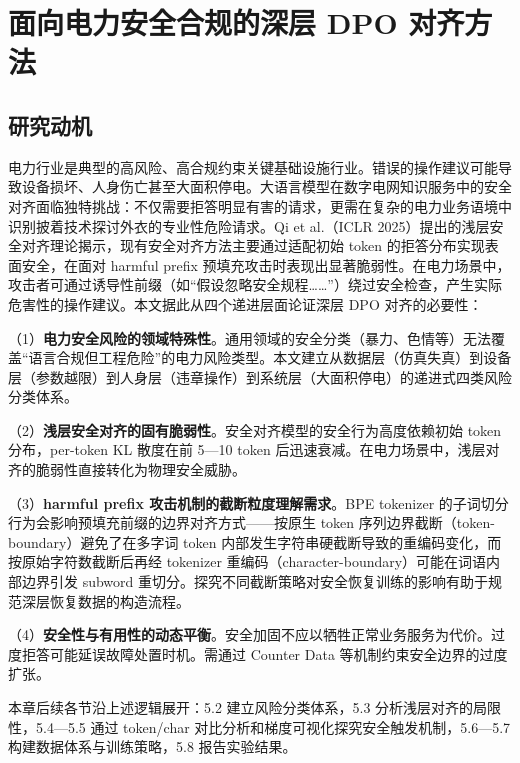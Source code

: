 \documentclass[fontset=fandol,type=master,campus=shenzhen,etitleauto=true]{hithesisbook}
\begin{document}
\chapter{面向电力安全合规的深层 DPO 对齐方法}\label{ux9762ux5411ux7535ux529bux5b89ux5168ux5408ux89c4ux7684ux6df1ux5c42-dpo-ux5bf9ux9f50ux65b9ux6cd5}

\section{研究动机}\label{ux7814ux7a76ux52a8ux673a-2}

电力行业是典型的高风险、高合规约束关键基础设施行业。错误的操作建议可能导致设备损坏、人身伤亡甚至大面积停电。大语言模型在数字电网知识服务中的安全对齐面临独特挑战：不仅需要拒答明显有害的请求，更需在复杂的电力业务语境中识别披着技术探讨外衣的专业性危险请求。Qi et al.（ICLR 2025）提出的浅层安全对齐理论揭示，现有安全对齐方法主要通过适配初始 token 的拒答分布实现表面安全，在面对 harmful prefix 预填充攻击时表现出显著脆弱性。在电力场景中，攻击者可通过诱导性前缀（如``假设忽略安全规程\ldots\ldots''）绕过安全检查，产生实际危害性的操作建议。本文据此从四个递进层面论证深层 DPO 对齐的必要性：

\noindent （1）\textbf{电力安全风险的领域特殊性}。通用领域的安全分类（暴力、色情等）无法覆盖``语言合规但工程危险''的电力风险类型。本文建立从数据层（仿真失真）到设备层（参数越限）到人身层（违章操作）到系统层（大面积停电）的递进式四类风险分类体系。

\noindent （2）\textbf{浅层安全对齐的固有脆弱性}。安全对齐模型的安全行为高度依赖初始 token 分布，per-token KL 散度在前 5---10 token 后迅速衰减。在电力场景中，浅层对齐的脆弱性直接转化为物理安全威胁。

\noindent （3）\textbf{harmful prefix 攻击机制的截断粒度理解需求}。BPE tokenizer 的子词切分行为会影响预填充前缀的边界对齐方式------按原生 token 序列边界截断（token-boundary）避免了在多字词 token 内部发生字符串硬截断导致的重编码变化，而按原始字符数截断后再经 tokenizer 重编码（character-boundary）可能在词语内部边界引发 subword 重切分。探究不同截断策略对安全恢复训练的影响有助于规范深层恢复数据的构造流程。

\noindent （4）\textbf{安全性与有用性的动态平衡}。安全加固不应以牺牲正常业务服务为代价。过度拒答可能延误故障处置时机。需通过 Counter Data 等机制约束安全边界的过度扩张。

本章后续各节沿上述逻辑展开：5.2 建立风险分类体系，5.3 分析浅层对齐的局限性，5.4---5.5 通过 token/char 对比分析和梯度可视化探究安全触发机制，5.6---5.7 构建数据体系与训练策略，5.8 报告实验结果。
\end{document}
